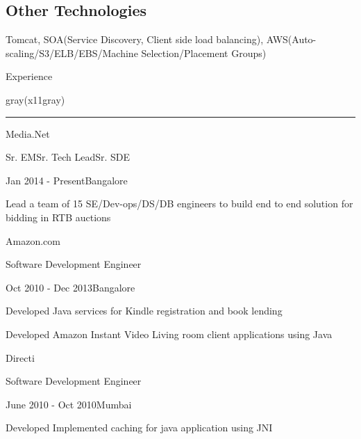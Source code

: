 \documentclass[10.5pt,a4paper]{article}
\begin{document}
\begin{multicols}{2}
\subsection{Other Technologies}
Tomcat, SOA(Service Discovery, Client side load balancing), AWS(Auto-scaling/S3/ELB/EBS/Machine Selection/Placement Groups)
\vspace{4mm}
\begin{section}{Experience}
\end{section}
\begin{color}{gray(x11gray)}\hrule\end{color}
\vspace{5mm}
\begin{expsec}{Media.Net}
\end{expsec}
\begin{expsubsec}{Sr. EM{\textbar}Sr. Tech Lead{\textbar}Sr. SDE}
\end{expsubsec}
\begin{timeandlocation}Jan 2014 - Present{\textbar}Bangalore
\end{timeandlocation}
\begin{desc}{Lead a team of 15 SE/Dev-ops/DS/DB engineers to build end to end solution for bidding in RTB auctions}
\end{desc}
\begin{expsec}{Amazon.com}
\end{expsec}
\begin{expsubsec}{Software Development Engineer}
\end{expsubsec}
\begin{timeandlocation}Oct 2010 - Dec 2013{\textbar}Bangalore
\end{timeandlocation}
\begin{desc}{Developed Java services for Kindle registration and book lending}
\end{desc}
\begin{desc}{Developed Amazon Instant Video Living room client applications using Java}
\end{desc}
\begin{expsec}{Directi}
\end{expsec}
\begin{expsubsec}{Software Development Engineer}
\end{expsubsec}
\begin{timeandlocation}June 2010 - Oct 2010{\textbar}Mumbai
\end{timeandlocation}
\begin{desc}{Developed Implemented caching for java application using JNI}

\end{desc}
\end{multicols}
\end{document}
